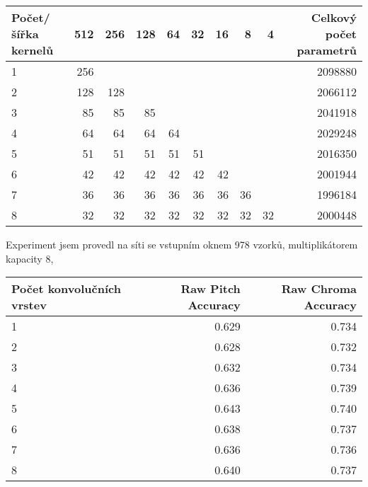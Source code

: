     \begin{tabular}{lrrrrrrrrr}
    \toprule
    Počet/šířka kernelů & 512 & 256 & 128 & 64 & 32 & 16 & 8  & 4  & Celkový počet parametrů  \\
    \midrule
    1                   & 256 &     &     &    &    &    &    &    & 2098880 \\
    2                   & 128 & 128 &     &    &    &    &    &    & 2066112 \\
    3                   & 85  & 85  & 85  &    &    &    &    &    & 2041918 \\
    4                   & 64  & 64  & 64  & 64 &    &    &    &    & 2029248 \\
    5                   & 51  & 51  & 51  & 51 & 51 &    &    &    & 2016350 \\
    6                   & 42  & 42  & 42  & 42 & 42 & 42 &    &    & 2001944 \\
    7                   & 36  & 36  & 36  & 36 & 36 & 36 & 36 &    & 1996184 \\
    8                   & 32  & 32  & 32  & 32 & 32 & 32 & 32 & 32 & 2000448 \\
    \bottomrule
    \end{tabular}

Experiment jsem provedl na síti se vstupním oknem 978 vzorků, multiplikátorem kapacity 8, 

    \begin{tabular}{lrr}
    \toprule
    Počet konvolučních vrstev &  Raw Pitch Accuracy &  Raw Chroma Accuracy \\
    \midrule
    1                         &               0.629 &                0.734 \\
    2                         &               0.628 &                0.732 \\
    3                         &               0.632 &                0.734 \\
    4                         &               0.636 &                0.739 \\
    5                         &               0.643 &                0.740 \\
    6                         &               0.638 &                0.737 \\
    7                         &               0.636 &                0.736 \\
    8                         &               0.640 &                0.737 \\
    \bottomrule
    \end{tabular}

